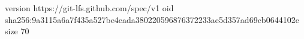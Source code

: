 version https://git-lfs.github.com/spec/v1
oid sha256:9a3115a6a7f435a527be4eada380220596876372233ae5d357ad69cb0644102e
size 70
